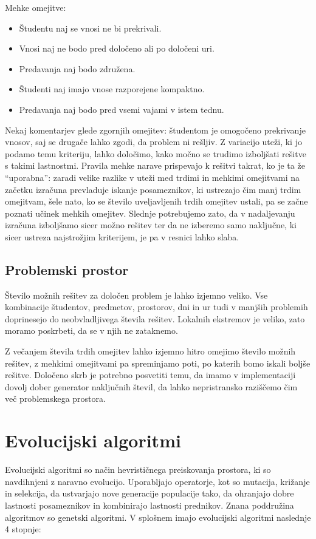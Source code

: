 \documentclass[a4paper,12pt]{book}
\begin{document}
\vspace{5ex}
\noindent Mehke omejitve:
\begin{itemize}
\item Študentu naj se vnosi ne bi prekrivali. 
\item Vnosi naj ne bodo pred določeno ali po določeni uri.
\item Predavanja naj bodo združena. 
\item Študenti naj imajo vnose razporejene kompaktno. 
\item Predavanja naj bodo pred vsemi vajami v istem tednu. 
\end{itemize}

\noindent
Nekaj komentarjev glede zgornjih omejitev: študentom je omogočeno prekrivanje vnosov, saj se drugače lahko zgodi, da problem ni rešljiv. Z variacijo uteži, ki jo podamo temu kriteriju, lahko določimo, kako močno se trudimo izboljšati rešitve s takimi lastnostmi. Pravila mehke narave prispevajo k rešitvi takrat, ko je ta že ``uporabna'': zaradi velike razlike v uteži med trdimi in mehkimi omejitvami na začetku izračuna prevladuje iskanje posameznikov, ki ustrezajo čim manj trdim omejitvam, šele nato, ko se število uveljavljenih trdih omejitev ustali, pa se začne poznati učinek mehkih omejitev. Slednje potrebujemo zato, da v nadaljevanju izračuna izboljšamo sicer možno rešitev ter da ne izberemo samo naključne, ki sicer ustreza najstrožjim kriterijem, je pa v resnici lahko slaba. 

\subsection{Problemski prostor}
Število možnih rešitev za določen problem je lahko izjemno veliko. Vse kombinacije študentov, predmetov, prostorov, dni in ur tudi v manjših problemih doprinesejo do neobvladljivega števila rešitev. Lokalnih ekstremov je veliko, zato moramo poskrbeti, da se v njih ne zataknemo. 

Z večanjem števila trdih omejitev lahko izjemno hitro omejimo število možnih rešitev, z mehkimi omejitvami pa spreminjamo poti, po katerih bomo iskali boljše rešitve. Določeno skrb je potrebno posvetiti temu, da imamo v implementaciji dovolj dober generator naključnih števil, da lahko nepristransko raziščemo čim več problemskega prostora. 


\section{Evolucijski algoritmi}
Evolucijski algoritmi so način hevrističnega preiskovanja prostora, ki so navdihnjeni z naravno evolucijo. Uporabljajo operatorje, kot so mutacija, križa\-nje in selekcija, da ustvarjajo nove generacije populacije tako, da ohranjajo dobre lastnosti posameznikov in kombinirajo lastnosti prednikov. Znana poddružina algoritmov so genetski algoritmi. V splošnem imajo evolucijski algoritmi naslednje 4 stopnje:  
\end{document}

